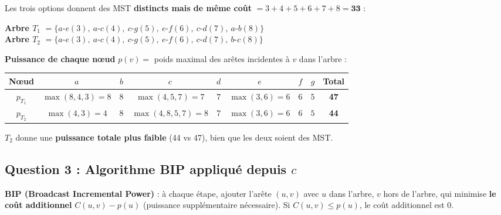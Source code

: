 \documentclass[12pt,a4paper]{article}
\begin{document}
\begin{solution}
Les trois options donnent des MST \textbf{distincts mais de même coût} $= 3+4+5+6+7+8 = \mathbf{33}$ :

\medskip
\textbf{Arbre $T_1$} $=\{a$-$e(3),\ a$-$c(4),\ c$-$g(5),\ e$-$f(6),\ c$-$d(7),\ a$-$b(8)\}$\\
\textbf{Arbre $T_2$} $=\{a$-$e(3),\ a$-$c(4),\ c$-$g(5),\ e$-$f(6),\ c$-$d(7),\ b$-$c(8)\}$

\medskip
\textbf{Puissance de chaque nœud} $p(v)=$ poids maximal des arêtes incidentes à $v$ dans l'arbre :

\begin{center}
\begin{tabular}{|c|c|c|c|c|c|c|c||c|}
\hline
\textbf{Nœud} & $a$ & $b$ & $c$ & $d$ & $e$ & $f$ & $g$ & \textbf{Total} \\\hline
$p_{T_1}$ & $\max(8,4,3)=8$ & $8$ & $\max(4,5,7)=7$ & $7$ & $\max(3,6)=6$ & $6$ & $5$ & \textbf{47} \\\hline
$p_{T_2}$ & $\max(4,3)=4$ & $8$ & $\max(4,8,5,7)=8$ & $7$ & $\max(3,6)=6$ & $6$ & $5$ & \textbf{44} \\\hline
\end{tabular}
\end{center}

$T_2$ donne une \textbf{puissance totale plus faible} (44 vs 47), bien que les deux soient des MST.
\end{solution}

\subsection{Question 3 : Algorithme BIP appliqué depuis $c$}

\begin{methode}
\textbf{BIP (Broadcast Incremental Power)} : à chaque étape, ajouter l'arête $(u,v)$ avec $u$ dans l'arbre, $v$ hors de l'arbre, qui minimise \textbf{le coût additionnel} $C(u,v) - p(u)$ (puissance supplémentaire nécessaire). Si $C(u,v) \le p(u)$, le coût additionnel est $0$.
\end{methode}
\end{document}

